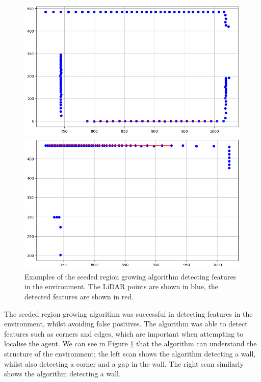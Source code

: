 \documentclass[12pt]{article}
\begin{document}
\begin{figure}[H]
    \centering
    \begin{minipage}{0.45\textwidth}
        \centering
        \includegraphics[width=\linewidth]{FE1}
    \end{minipage}
    \begin{minipage}{0.45\textwidth}
        \centering
        \includegraphics[width=\linewidth]{FE2}
    \end{minipage}
    \caption[Short caption]{Examples of the seeded region growing algorithm detecting features in the environment. The LiDAR
    points are shown in blue, the detected features are shown in red.}
    \label{fig:feature_extraction}
\end{figure}
The seeded region growing algorithm was successful in detecting features in the environment, whilst avoiding false positives.
The algorithm was able to detect features such as corners and edges, which are important when attempting to localise the agent.
We can see in Figure \ref{fig:feature_extraction} that the algorithm can understand the structure of the environment; the left scan
shows the algorithm detecting a wall, whilst also detecting a corner and a gap in the wall. The right scan similarly shows the
algorithm detecting a wall.\\
\end{document}
